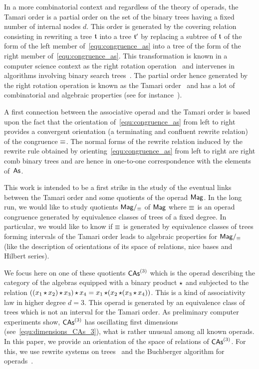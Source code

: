 In a more combinatorial context and regardless of the theory of operads,
the Tamari order is a partial order on the set of the binary trees
having a fixed number of internal nodes $d$. This order is generated by
the covering relation consisting in rewriting a tree $\mathfrak{t}$ into a tree
$\mathfrak{t}'$ by replacing a subtree of $\mathfrak{t}$ of the form of the left member
of~\eqref{equ:congruence_as} into a tree of the form of the right member
of~\eqref{equ:congruence_as}. This transformation is known in a computer
science context as the right rotation operation~\cite{Knu98} and
intervenes in algorithms involving binary search trees~\cite{AVL62}. The
partial order hence generated by the right rotation operation is known
as the Tamari order~\cite{Tam62} and has a lot of combinatorial and
algebraic properties (see for instance~\cite{HT72,Cha06}).
\medbreak

A first connection between the associative operad and the Tamari order
is based upon the fact that the orientation of~\eqref{equ:congruence_as}
from left to right provides a convergent orientation (a terminating and
confluent rewrite relation) of the congruence $\operatorname{\equiv}$. The normal
forms of the rewrite relation induced by the rewrite rule obtained by
orienting~\eqref{equ:congruence_as} from left to right are right comb
binary trees and are hence in one-to-one correspondence with the
elements of~$\mathsf{As}$.
\medbreak

This work is intended to be a first strike in the study of the eventual
links between the Tamari order and some quotients of the operad $\mathsf{Mag}$.
In the long run, we would like to study quotients $\mathsf{Mag}/_{\operatorname{\equiv}}$ of
$\mathsf{Mag}$ where $\operatorname{\equiv}$ is an operad congruence generated by equivalence
classes of trees of a fixed degree. In particular, we would like to know
if $\operatorname{\equiv}$ is generated by equivalence classes of trees forming
intervals of the Tamari order leads to algebraic properties for
$\mathsf{Mag}/_{\operatorname{\equiv}}$ (like the description of orientations of its space of
relations, nice bases and Hilbert series).
\medbreak

We focus here on one of these quotients $\mathsf{CAs}^{\left(3\right)}$ which is the operad
describing the category of the algebras equipped with a binary product
$\operatorname{\star}$ and subjected to the relation
\begin{math}
    ((x_1 \operatorname{\star} x_2) \operatorname{\star} x_3) \operatorname{\star} x_4
    =
    x_1 \operatorname{\star} (x_2 \operatorname{\star} (x_3 \operatorname{\star} x_4))
\end{math}.
This is a kind of associativity law in higher degree $d = 3$. This
operad is generated by an equivalence class of trees which is not an
interval for the Tamari order. As preliminary computer experiments show,
$\mathsf{CAs}^{\left(3\right)}$ has oscillating first dimensions
(see~\eqref{equ:dimensions_CAs_3}), what is rather unusual among all
known operads. In this paper, we provide an orientation of the space of
relations of $\mathsf{CAs}^{\left(3\right)}$. For this, we use rewrite systems on
trees~\cite{BN98} and the Buchberger algorithm for operads~\cite{DK10}.
\medbreak

